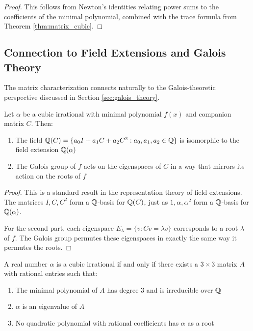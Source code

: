 \begin{proof}
This follows from Newton's identities relating power sums to the coefficients of the minimal polynomial, combined with the trace formula from Theorem \ref{thm:matrix_cubic}.
\end{proof}

\subsection{Connection to Field Extensions and Galois Theory}

The matrix characterization connects naturally to the Galois-theoretic perspective discussed in Section \ref{sec:galois_theory}.

\begin{proposition}\label{prop:matrix_field}
Let $\alpha$ be a cubic irrational with minimal polynomial $f(x)$ and companion matrix $C$. Then:
\begin{enumerate}
    \item The field $\mathbb{Q}(C) = \{a_0I + a_1C + a_2C^2 : a_0, a_1, a_2 \in \mathbb{Q}\}$ is isomorphic to the field extension $\mathbb{Q}(\alpha)$
    \item The Galois group of $f$ acts on the eigenspaces of $C$ in a way that mirrors its action on the roots of $f$
\end{enumerate}
\end{proposition}

\begin{proof}
This is a standard result in the representation theory of field extensions. The matrices $I, C, C^2$ form a $\mathbb{Q}$-basis for $\mathbb{Q}(C)$, just as $1, \alpha, \alpha^2$ form a $\mathbb{Q}$-basis for $\mathbb{Q}(\alpha)$.

For the second part, each eigenspace $E_{\lambda} = \{v : Cv = \lambda v\}$ corresponds to a root $\lambda$ of $f$. The Galois group permutes these eigenspaces in exactly the same way it permutes the roots.
\end{proof}

\begin{theorem}\label{thm:structural_matrix}
A real number $\alpha$ is a cubic irrational if and only if there exists a $3 \times 3$ matrix $A$ with rational entries such that:
\begin{enumerate}
    \item The minimal polynomial of $A$ has degree 3 and is irreducible over $\mathbb{Q}$
    \item $\alpha$ is an eigenvalue of $A$
    \item No quadratic polynomial with rational coefficients has $\alpha$ as a root
\end{enumerate}
\end{theorem}

